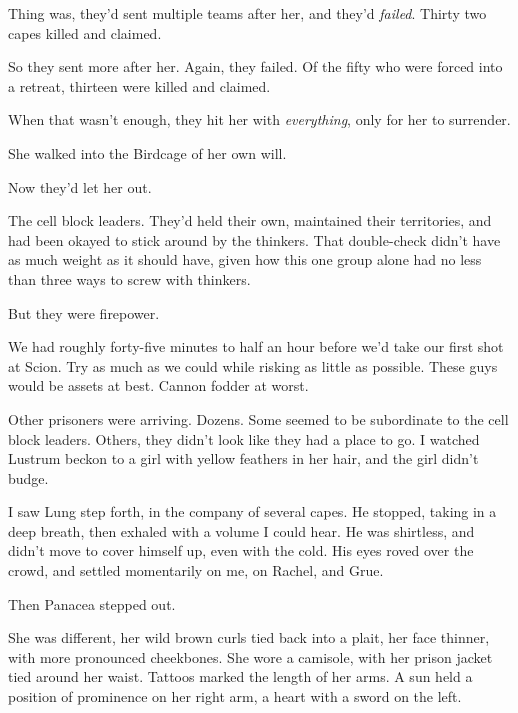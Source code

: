 Thing was, they'd sent multiple teams after her, and they'd \emph{failed}.  Thirty two capes killed and claimed.



So they sent more after her.  Again, they failed.  Of the fifty who were forced into a retreat, thirteen were killed and claimed.



When that wasn't enough, they hit her with \emph{everything}, only for her to surrender.



She walked into the Birdcage of her own will.



Now they'd let her out.



The cell block leaders.  They'd held their own, maintained their territories, and had been okayed to stick around by the thinkers.  That double-check didn't have as much weight as it should have, given how this one group alone had no less than three ways to screw with thinkers.



But they were firepower.



We had roughly forty-five minutes to half an hour before we'd take our first shot at Scion.  Try as much as we could while risking as little as possible.  These guys would be assets at best.  Cannon fodder at worst.



Other prisoners were arriving.  Dozens.  Some seemed to be subordinate to the cell block leaders.  Others, they didn't look like they had a place to go.  I watched Lustrum beckon to a girl with yellow feathers in her hair, and the girl didn't budge.



I saw Lung step forth, in the company of several capes.  He stopped, taking in a deep breath, then exhaled with a volume I could hear.  He was shirtless, and didn't move to cover himself up, even with the cold.  His eyes roved over the crowd, and settled momentarily on me, on Rachel, and Grue.



Then Panacea stepped out.



She was different, her wild brown curls tied back into a plait, her face thinner, with more pronounced cheekbones.  She wore a camisole, with her prison jacket tied around her waist.  Tattoos marked the length of her arms.  A sun held a position of prominence on her right arm, a heart with a sword on the left.



